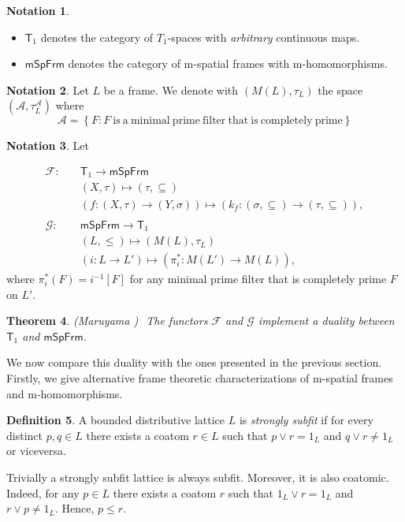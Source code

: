 \documentclass{article}
\newcommand{\aaa}{\mathcal{A} }
\theoremstyle{plain}
\newtheorem{theorem}{Theorem}[subsection]
\theoremstyle{definition}
\newtheorem{definition}[theorem]{Definition}
\newtheorem{notation}[theorem]{Notation}
\theoremstyle{remark}
\newcommand{\bool}[1]{\mathsf{#1}}
\newcommand{\bp}[1]{\left\lbrace #1 \right\rbrace}
\newcommand{\0}{\mathbbm 0}
\newcommand{\1}{\mathbbm 1}
\newcommand{\2}{\mathbbm 2}
\begin{document}
\begin{notation}
\emph{}
\begin{itemize}
\item
    \label{not:t1}
    $\bool{T}_1$ denotes the category of $T_1$-spaces with \emph{arbitrary} continuous maps.
    
    \item
    \label{not:mfrm}
    $\bool{mSpFrm}$ denotes the category of m-spatial frames with m-homomorphisms.
\end{itemize}
\end{notation}


\begin{notation}
    \label{not:complety prime minimal filters}
    Let $L$ be a frame. We denote with $(M(L), \tau_L)$ the space $(\aaa, \tau^\aaa_L)$ where \[\aaa=\bp{F: F \mathrm{\ is \ a \ minimal \ prime \ filter \ that \ is \ completely \ prime}}\]
\end{notation}
\begin{notation}
\label{not:functors-maruyama}
Let

\begin{align*}
\mathcal{F}: & \quad \bool{T}_1\to \bool{mSpFrm} \\
& \quad (X, \tau) \mapsto (\tau, \subseteq) \\
& \quad (f: (X, \tau) \to (Y, \sigma)) \mapsto (k_f: (\sigma, \subseteq) \to (\tau, \subseteq)),
\\ 
\\
\mathcal{G}: & \quad \bool{mSpFrm}\to \bool{T}_1 \\
& \quad (L, \leq) \mapsto (M(L), \tau_L) \\
& \quad (i : L \to L') \mapsto (\pi^*_i:M(L') \to M(L)),
\end{align*}
where $\pi^*_i(F)=i^{-1}[F]$ for any minimal prime filter that is completely prime  $F$ on $L'$.
\end{notation}

\begin{theorem}(Maruyama \cite[Thm. 4.6]{maruyama}) 
\label{thm:Maruyama duality} $ $
    The functors $\mathcal{F}$ and $\mathcal{G}$ implement a duality between $\bool{T}_1$ and $\bool{mSpFrm}$.
\end{theorem}

We now compare this duality with the ones presented in the previous section.
Firstly, we give alternative frame theoretic characterizations of m-spatial frames and
m-homomorphisms.
\begin{definition}
    \label{def:stronglysubfit}
A bounded distributive lattice \(L\) is \emph{strongly subfit} if for every distinct \(p,q \in L\)  there exists a  coatom \(r \in L\) such that \(p \vee r=1_L\) and \(q \vee r\neq 1_L\) or viceversa. 
\end{definition}
Trivially a strongly subfit lattice is always subfit. Moreover, it is also coatomic. Indeed, for any \(p \in L\) there exists a coatom \(r \) such that \(1_L \vee r=1_L\) and \(r \vee p \neq 1_L\). Hence, \(p \leq r\).
\end{document}
